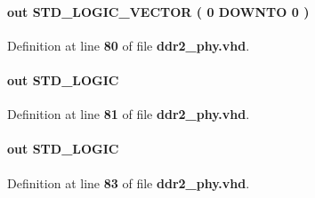 \paragraph[{mem\+\_\+odt}]{ {\bfseries \textcolor{keywordflow}{out}\textcolor{vhdlchar}{ }} {\bfseries \textcolor{comment}{S\+T\+D\+\_\+\+L\+O\+G\+I\+C\+\_\+\+V\+E\+C\+T\+OR}\textcolor{vhdlchar}{ }\textcolor{vhdlchar}{(}\textcolor{vhdlchar}{ }\textcolor{vhdlchar}{ } \textcolor{vhdldigit}{0} \textcolor{vhdlchar}{ }\textcolor{keywordflow}{D\+O\+W\+N\+TO}\textcolor{vhdlchar}{ }\textcolor{vhdlchar}{ } \textcolor{vhdldigit}{0} \textcolor{vhdlchar}{ }\textcolor{vhdlchar}{)}\textcolor{vhdlchar}{ }} \hspace{0.3cm}{\ttfamily [Port]}}\label{classddr2__phy_a95035645a864ed754fadafcc327d8193}


Definition at line {\bf 80} of file {\bf ddr2\+\_\+phy.\+vhd}.

\paragraph[{mem\+\_\+ras\+\_\+n}]{ {\bfseries \textcolor{keywordflow}{out}\textcolor{vhdlchar}{ }} {\bfseries \textcolor{comment}{S\+T\+D\+\_\+\+L\+O\+G\+IC}\textcolor{vhdlchar}{ }} \hspace{0.3cm}{\ttfamily [Port]}}\label{classddr2__phy_a66af27d2b7e4e52023322398b6717931}


Definition at line {\bf 81} of file {\bf ddr2\+\_\+phy.\+vhd}.

\paragraph[{mem\+\_\+reset\+\_\+n}]{ {\bfseries \textcolor{keywordflow}{out}\textcolor{vhdlchar}{ }} {\bfseries \textcolor{comment}{S\+T\+D\+\_\+\+L\+O\+G\+IC}\textcolor{vhdlchar}{ }} \hspace{0.3cm}{\ttfamily [Port]}}\label{classddr2__phy_aef8094c068cd7517e779f2c63ec19e51}


Definition at line {\bf 83} of file {\bf ddr2\+\_\+phy.\+vhd}.

